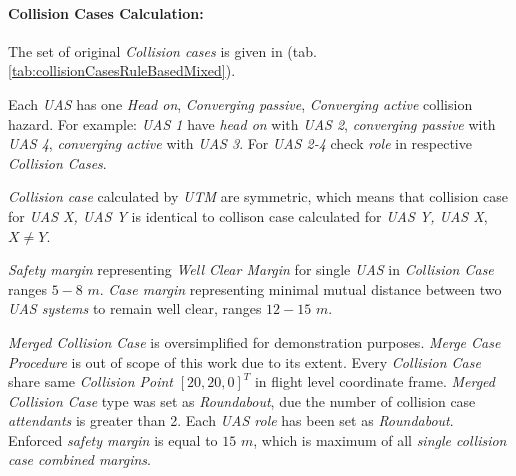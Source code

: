 \paragraph{Collision Cases Calculation:} The set of original \emph{Collision cases} is given in (tab. \ref{tab:collisionCasesRuleBasedMixed}). 

Each \emph{UAS} has one \emph{Head on}, \emph{Converging passive}, \emph{Converging active} collision hazard. For example: \emph{UAS 1} have \emph{head on} with  \emph{UAS 2}, \emph{converging passive} with \emph{UAS 4}, \emph{converging active} with \emph{UAS 3}. For \emph{UAS 2-4} check \emph{role} in respective \emph{Collision Cases}.

\begin{note} \emph{Collision case} calculated by \emph{UTM} are symmetric, which means that collision case for \emph{UAS X, UAS Y} is identical to collison case calculated for \emph{UAS Y, UAS X}, $X \neq Y$.
\end{note}

\emph{Safety margin} representing \emph{Well Clear Margin} for single \emph{UAS} in \emph{Collision Case} ranges $5-8$ $m$. \emph{Case margin} representing minimal mutual distance between two \emph{UAS systems} to remain well clear, ranges $12-15$ $m$.

\emph{Merged Collision Case} is oversimplified for demonstration purposes. \emph{Merge Case Procedure} is out of scope of this work due to its extent. Every \emph{Collision Case} share same \emph{Collision Point} $[20,20,0]^T$ in flight level coordinate frame. \emph{Merged Collision Case} type was set as \emph{Roundabout}, due the number of collision case \emph{attendants} is greater than 2. Each \emph{UAS role} has been set as \emph{Roundabout}. Enforced \emph{safety margin} is equal to $15$ $m$, which is maximum of all \emph{single collision case combined margins}.

